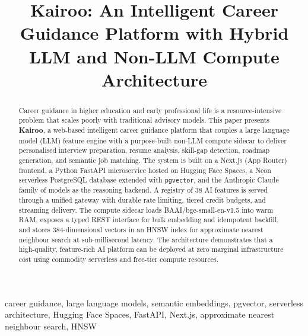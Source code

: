 \documentclass[conference]{IEEEtran}
\begin{document}
\title{Kairoo: An Intelligent Career Guidance Platform with Hybrid LLM and Non-LLM Compute Architecture}

\author{
\and
{}
}

\maketitle

\begin{abstract}
Career guidance in higher education and early professional life is a resource-intensive problem that scales poorly with traditional advisory models. This paper presents \textbf{Kairoo}, a web-based intelligent career guidance platform that couples a large language model (LLM) feature engine with a purpose-built non-LLM compute sidecar to deliver personalised interview preparation, resume analysis, skill-gap detection, roadmap generation, and semantic job matching. The system is built on a Next.js (App Router) frontend, a Python FastAPI microservice hosted on Hugging Face Spaces, a Neon serverless PostgreSQL database extended with \texttt{pgvector}, and the Anthropic Claude family of models as the reasoning backend. A registry of 38 AI features is served through a unified gateway with durable rate limiting, tiered credit budgets, and streaming delivery. The compute sidecar loads BAAI/bge-small-en-v1.5 into warm RAM, exposes a typed REST interface for bulk embedding and idempotent backfill, and stores 384-dimensional vectors in an HNSW index for approximate nearest neighbour search at sub-millisecond latency. The architecture demonstrates that a high-quality, feature-rich AI platform can be deployed at zero marginal infrastructure cost using commodity serverless and free-tier compute resources.
\end{abstract}

\begin{IEEEkeywords}
career guidance, large language models, semantic embeddings, pgvector, serverless architecture, Hugging Face Spaces, FastAPI, Next.js, approximate nearest neighbour search, HNSW
\end{IEEEkeywords}
\end{document}

